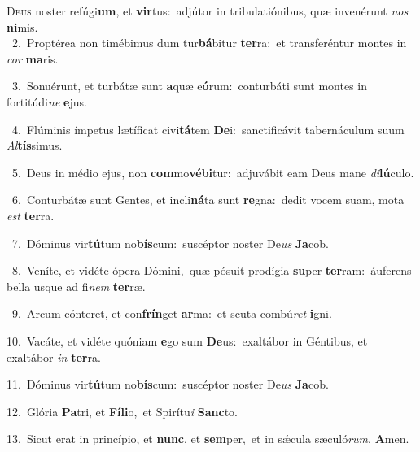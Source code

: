 \lettrine{\initial\textcolor{\initialcolor}{D}}{eus} noster refúgi\-\textbf{um}\-, et \textbf{vir}\-tus:~\star adjútor in tribulatiónibus, quæ invenérunt \textit{nos} \textbf{ni}\-mis.\\
{\numbfont\textcolor{\numbcolor}{~2.}}~Proptérea non timébimus dum tur\-\textbf{bá}\-bitur \textbf{ter}\-ra:~\star et transferéntur montes in \textit{cor} \textbf{ma}\-ris.\par
{\numbfont\textcolor{\numbcolor}{~3.}}~Sonuérunt, et turbátæ sunt \textbf{a}\-quæ e\-\textbf{ó}\-rum:~\star conturbáti sunt montes in fortitúdi\textit{ne} \textbf{e}\-jus.\par
{\numbfont\textcolor{\numbcolor}{~4.}}~Flúminis ímpetus lætíficat civi\-\textbf{tá}\-tem \textbf{De}\-i:~\star sanctificávit tabernáculum suum \textit{Al}\-\textbf{tís}simus.\par
{\numbfont\textcolor{\numbcolor}{~5.}}~Deus in médio ejus, non \textbf{com}\-mo\-\textbf{vé}\-\textbf{bi}tur:~\star adjuvábit eam Deus mane \textit{di}\-\textbf{lú}culo.\par
{\numbfont\textcolor{\numbcolor}{~6.}}~Conturbátæ sunt Gentes, et incli\-\textbf{ná}\-ta sunt \textbf{re}\-gna:~\star dedit vocem suam, mota \textit{est} \textbf{ter}\-ra.\par
{\numbfont\textcolor{\numbcolor}{~7.}}~Dóminus vir\-\textbf{tú}\-tum no\-\textbf{bís}\-cum:~\star suscéptor noster De\textit{us} \textbf{Ja}\-cob.\par
{\numbfont\textcolor{\numbcolor}{~8.}}~Veníte, et vidéte ópera Dómini,~\dagger quæ pósuit prodígia \textbf{su}\-per \textbf{ter}\-ram:~\star áuferens bella usque ad fi\textit{nem} \textbf{ter}\-ræ.\par
{\numbfont\textcolor{\numbcolor}{~9.}}~Arcum cónteret, et con\-\textbf{frín}\-get \textbf{ar}\-ma:~\star et scuta combú\textit{ret} \textbf{i}\-gni.\par
{\numbfont\textcolor{\numbcolor}{10.}}~Vacáte, et vidéte quóniam \textbf{e}\-go sum \textbf{De}\-us:~\star exaltábor in Géntibus, et exaltábor \textit{in} \textbf{ter}\-ra.\par
{\numbfont\textcolor{\numbcolor}{11.}}~Dóminus vir\-\textbf{tú}\-tum no\-\textbf{bís}\-cum:~\star suscéptor noster De\textit{us} \textbf{Ja}\-cob.\par
{\numbfont\textcolor{\numbcolor}{12.}}~Glória \textbf{Pa}\-tri, et \textbf{Fí}\-\textbf{li}o,~\star et Spirítu\textit{i} \textbf{Sanc}\-to.\par
{\numbfont\textcolor{\numbcolor}{13.}}~Sicut erat in princípio, et \textbf{nunc}\-, et \textbf{sem}\-per,~\star et in sǽcula sæculó\-\textit{rum}\-. \textbf{A}\-men.\par
